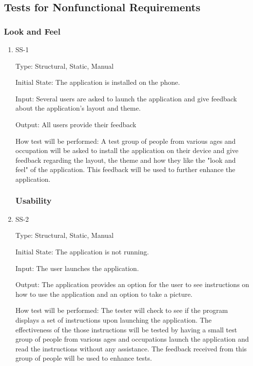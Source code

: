 \documentclass[12pt, titlepage]{article}
\begin{document}
\subsection{Tests for Nonfunctional Requirements}

\subsubsection{Look and Feel}
		
\begin{enumerate}

\item{SS-1\\}

Type: Structural, Static, Manual
					
Initial State: The application is installed on the phone.
					
Input: Several users are asked to launch the application and give feedback about the application's layout and theme.
					
Output: All users provide their feedback
					
How test will be performed: A test group of people from various ages and occupation will be asked to install the application on their device and give feedback regarding the layout, the theme and how they like the "look and feel" of the application. This feedback will be used to further enhance the application.
					
\subsubsection{Usability}
\item{SS-2\\}

Type: Structural, Static, Manual
					
Initial State: The application is not running.
					
Input: The user launches the application.
					
Output: The application provides an option for the user to see instructions on how to use the application and an option to take a picture.
					
How test will be performed: The tester will check to see if the program displays a set of instructions upon launching the application. The effectiveness of the those instructions will be tested by having a small test group of people from various ages and occupations launch the application and read the instructions without any assistance. The feedback received from this group of people will be used to enhance tests.


\end{enumerate}
\end{document}
